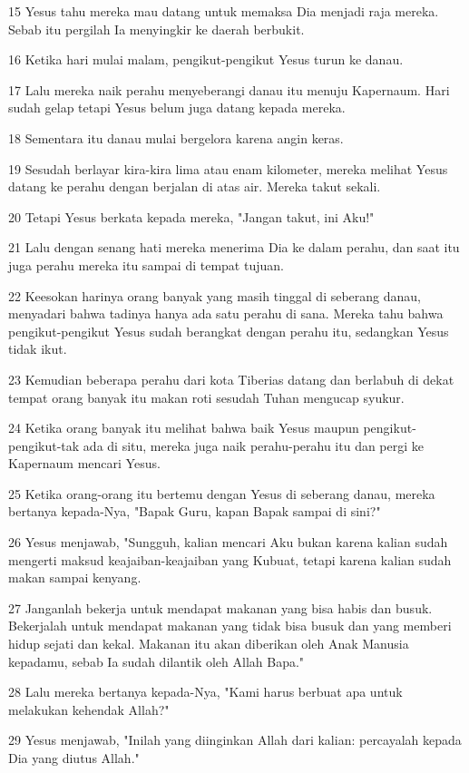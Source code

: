 \par 15 Yesus tahu mereka mau datang untuk memaksa Dia menjadi raja mereka. Sebab itu pergilah Ia menyingkir ke daerah berbukit.
\par 16 Ketika hari mulai malam, pengikut-pengikut Yesus turun ke danau.
\par 17 Lalu mereka naik perahu menyeberangi danau itu menuju Kapernaum. Hari sudah gelap tetapi Yesus belum juga datang kepada mereka.
\par 18 Sementara itu danau mulai bergelora karena angin keras.
\par 19 Sesudah berlayar kira-kira lima atau enam kilometer, mereka melihat Yesus datang ke perahu dengan berjalan di atas air. Mereka takut sekali.
\par 20 Tetapi Yesus berkata kepada mereka, "Jangan takut, ini Aku!"
\par 21 Lalu dengan senang hati mereka menerima Dia ke dalam perahu, dan saat itu juga perahu mereka itu sampai di tempat tujuan.
\par 22 Keesokan harinya orang banyak yang masih tinggal di seberang danau, menyadari bahwa tadinya hanya ada satu perahu di sana. Mereka tahu bahwa pengikut-pengikut Yesus sudah berangkat dengan perahu itu, sedangkan Yesus tidak ikut.
\par 23 Kemudian beberapa perahu dari kota Tiberias datang dan berlabuh di dekat tempat orang banyak itu makan roti sesudah Tuhan mengucap syukur.
\par 24 Ketika orang banyak itu melihat bahwa baik Yesus maupun pengikut-pengikut-tak ada di situ, mereka juga naik perahu-perahu itu dan pergi ke Kapernaum mencari Yesus.
\par 25 Ketika orang-orang itu bertemu dengan Yesus di seberang danau, mereka bertanya kepada-Nya, "Bapak Guru, kapan Bapak sampai di sini?"
\par 26 Yesus menjawab, "Sungguh, kalian mencari Aku bukan karena kalian sudah mengerti maksud keajaiban-keajaiban yang Kubuat, tetapi karena kalian sudah makan sampai kenyang.
\par 27 Janganlah bekerja untuk mendapat makanan yang bisa habis dan busuk. Bekerjalah untuk mendapat makanan yang tidak bisa busuk dan yang memberi hidup sejati dan kekal. Makanan itu akan diberikan oleh Anak Manusia kepadamu, sebab Ia sudah dilantik oleh Allah Bapa."
\par 28 Lalu mereka bertanya kepada-Nya, "Kami harus berbuat apa untuk melakukan kehendak Allah?"
\par 29 Yesus menjawab, "Inilah yang diinginkan Allah dari kalian: percayalah kepada Dia yang diutus Allah."
